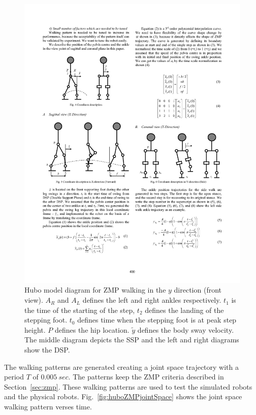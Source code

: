 \begin{figure}[t]
  \centering
\includegraphics[width=0.7\columnwidth]{./examples/pix/huboZMPy.pdf}
  \caption{Hubo model diagram for ZMP walking in the $y$ direction (front view).  $A_R$ and $A_L$ defines the left and right ankles respectively.  $t_1$ is the time of the starting of the step, $t_2$ defines the landing of the stepping foot.  $t_0$ defines time when the stepping foot is at peak step height.  $P$ defines the hip location.  $\widetilde{y}$ defines the body sway velocity.  The middle diagram depicts the SSP and the left and right diagrams show the DSP.}
  \label{fig:huboZMPy}
\end{figure}


The walking patterns are generated creating a joint space trajectory with a period $T$ of $0.005~sec$.
The patterns keep the ZMP criteria described in Section~\ref{sec:zmp}.
These walking patterns are used to test the simulated robots and the physical robots.
Fig.~\ref{fig:huboZMPjointSpace} shows the joint space walking pattern verses time.

